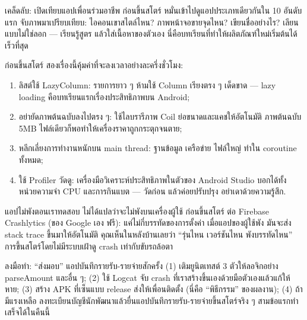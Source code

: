 \begin{tcbinfo}{เคล็ดลับ: เปิดเทียบแอปเพื่อนร่วมอาชีพ}
ก่อนขึ้นสโตร์ หมั่นเข้าไปดูแอปประเภทเดียวกันใน 10 อันดับแรก จับภาพมาเปรียบเทียบ: ไอคอนเขาสไตล์ไหน? ภาพหน้าจอขายจุดไหน? เขียนชื่ออย่างไร? เลียนแบบไม่ใช่ลอก — เรียนรู้สูตร แล้วใส่เนื้อหาของตัวเอง นี่คือบทเรียนที่ทำให้ผลิตภัณฑ์ใหม่เริ่มต้นได้เร็วที่สุด

\end{tcbinfo}


ก่อนขึ้นสโตร์ สองเรื่องนี้คุ้มค่าที่จะลงเวลาอย่างละครึ่งชั่วโมง:


\begin{enumerate}
  \item ลิสต์ใช้ LazyColumn: รายการยาว ๆ ห้ามใช้ Column เรียงตรง ๆ เด็ดขาด — lazy loading คือบทเรียนแรกเรื่องประสิทธิภาพบน Android;
  \item อย่ายัดภาพต้นฉบับลงไปตรง ๆ: ใช้ไลบรารีภาพ Coil ย่อขนาดและแคชให้อัตโนมัติ ภาพต้นฉบับ 5MB ไฟล์เดียวก็พอทำให้เครื่องราคาถูกกระตุกจนตาย;
  \item หลีกเลี่ยงการทำงานหนักบน main thread: ฐานข้อมูล เครือข่าย ไฟล์ใหญ่ ทำใน coroutine ทั้งหมด;
  \item ใช้ Profiler วัดดู: เครื่องมือวิเคราะห์ประสิทธิภาพในตัวของ Android Studio บอกได้ทั้งหน่วยความจำ CPU และการกินแบต — วัดก่อน แล้วค่อยปรับปรุง อย่าเดาด้วยความรู้สึก.
\end{enumerate}


แอปไม่พังตอนเราทดสอบ ไม่ได้แปลว่าจะไม่พังบนเครื่องผู้ใช้ ก่อนขึ้นสโตร์ ต่อ Firebase Crashlytics (ของ Google เอง ฟรี): แค่ไม่กี่บรรทัดของการตั้งค่า เมื่อแอปของผู้ใช้พัง มันจะส่ง stack trace ขึ้นมาให้อัตโนมัติ คุณเห็นในหลังบ้านเลยว่า “รุ่นไหน เวอร์ชันไหน พังบรรทัดไหน” การขึ้นสโตร์โดยไม่มีระบบเฝ้าดู crash เท่ากับขับรถล้อตา

\begin{tcbpractice}{ลงมือทำ: “ส่งมอบ” แอปบันทึกรายรับ-รายจ่ายสักครั้ง}
(1) เติมยูนิตเทสต์ 3 ตัวให้ลอจิกอย่าง parseAmount และอื่น ๆ; (2) ใช้ Logcat จับ crash ที่เราสร้างขึ้นเองด้วยมือตัวเองแล้วแก้ให้หาย; (3) สร้าง APK ที่เซ็นแบบ release ส่งให้เพื่อนติดตั้ง (นี่คือ “พิธีกรรม” ของผลงาน); (4) ถ้ามีแรงเหลือ ลงทะเบียนบัญชีนักพัฒนาแล้วยื่นแอปบันทึกรายรับ-รายจ่ายขึ้นสโตร์จริง ๆ สามข้อแรกทำเสร็จได้ในคืนนี้

\end{tcbpractice}


